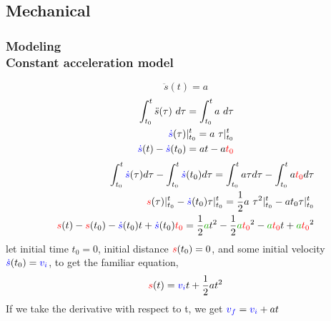 \documentclass[hyperref={pdfpagelabels=true}]{beamer}
\begin{document}
\subsection{Mechanical}

\begin{frame}
\frametitle{Modeling\\ {\large Constant acceleration model}} 
\tiny{
$$\ddot{s}(t)=a$$
\noindent\makebox[\linewidth]{\rule{10 cm}{0.1pt}}
\begin{align*}
\int_{t_0}^t \ddot{s}(\tau) \ d\tau=\int_{t_0}^t a \ d\tau \\
\textcolor{blue}{\dot{s}}(\tau)|^t_{t_0} = a \  \tau|^t_{t_0} \\
\textcolor{blue}{\dot{s}}(t) - \textcolor{blue}{\dot{s}}(t_0) = at-a\textcolor{red}{t_0}
\end{align*}
\noindent\makebox[\linewidth]{\rule{10 cm}{0.1pt}}
\begin{align*}
\int_{t_0}^t \textcolor{blue}{\dot{s}}(\tau)d\tau - \int_{t_0}^t \textcolor{blue}{\dot{s}}(t_0) d \tau = \int_{t_0}^t a\tau d\tau - \int_{t_0}^t a\textcolor{red}{t_0}d\tau \\
\textcolor{red}{s}(\tau)|^t_{t_0}-\textcolor{blue}{\dot{s}}(t_0)\tau|^t_{t_0}  = \frac{1}{2}a \  \tau^2|^t_{t_0}-at_0\tau|^t_{t_0} \\
\textcolor{red}{s}(t)-\textcolor{red}{s}(t_0)-\textcolor{blue}{\dot s}(t_0)t+\textcolor{blue}{\dot s}(t_0)\textcolor{red}{t_0}=\frac{1}{2}\textcolor{mygreen}{a}t^2-\frac{1}{2}\textcolor{mygreen}{a}\textcolor{red}{t_0}^2-\textcolor{mygreen}{a}\textcolor{red}{t_0}t+\textcolor{mygreen}{a}\textcolor{red}{t_0}^2
\end{align*}
\noindent\makebox[\linewidth]{\rule{10 cm}{0.1pt}}
let initial time $t_0 = 0$, initial distance $\textcolor{red}{s}(t_ 0) = 0$, and some initial velocity
$\textcolor{blue}{\dot s}(t_0) = \textcolor{blue}{v_i}$, to get the familiar equation,
$$\textcolor{red}{s}(t)=\textcolor{blue}{v_i}t+\frac{1}{2}at^2$$
If we take the derivative with respect to t, we get $\textcolor{blue}{v_f}= \textcolor{blue}{v_i} + at$
}
\end{frame}
\end{document}
